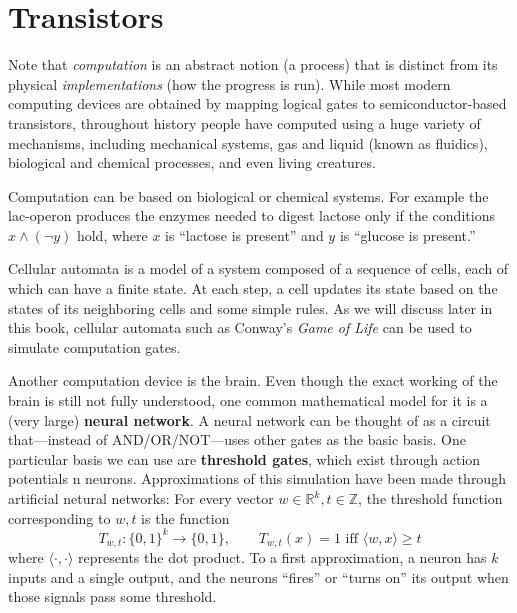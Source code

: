 \section{Transistors}

  Note that \textit{computation} is an abstract notion (a process) that is distinct from its physical \textit{implementations} (how the progress is run). While most modern computing devices are obtained by mapping logical gates to semiconductor-based transistors, throughout history people have computed using a huge variety of mechanisms, including mechanical systems, gas and liquid (known as fluidics), biological and chemical processes, and even living creatures. 

  \begin{example}
    Computation can be based on biological or chemical systems. For example the lac-operon produces the enzymes needed to digest lactose only if the conditions $x \wedge (\lnot y)$ hold, where $x$ is ``lactose is present'' and $y$ is ``glucose is present.''
  \end{example}

  \begin{example}
    Cellular automata is a model of a system composed of a sequence of cells, each of which can have a finite state. At each step, a cell updates its state based on the states of its neighboring cells and some simple rules. As we will discuss later in this book, cellular automata such as Conway’s \textit{Game of Life} can be used to simulate computation gates.
  \end{example}

  \begin{example}
    Another computation device is the brain. Even though the exact working of the brain is still not fully understood, one common mathematical model for it is a (very large) \textbf{neural network}. A neural network can be thought of as a circuit that---instead of AND/OR/NOT---uses other gates as the basic basis. One particular basis we can use are \textbf{threshold gates}, which exist through action potentials n neurons. Approximations of this simulation have been made through artificial netural networks: For every vector $w \in \mathbb{R}^k, t \in \mathbb{Z}$, the threshold function corresponding to $w, t$ is the function 
    \begin{equation}
      T_{w, t} :\{0,1\}^k \longrightarrow \{0,1\}, \qquad T_{w, t}(x) = 1 \text{ iff } \langle w, x \rangle \geq t
    \end{equation}
    where $\langle \cdot, \cdot \rangle$ represents the dot product. To a first approximation, a neuron has $k$ inputs and a single output, and the neurons “fires” or “turns on” its output when those signals pass some threshold. 
  \end{example}

